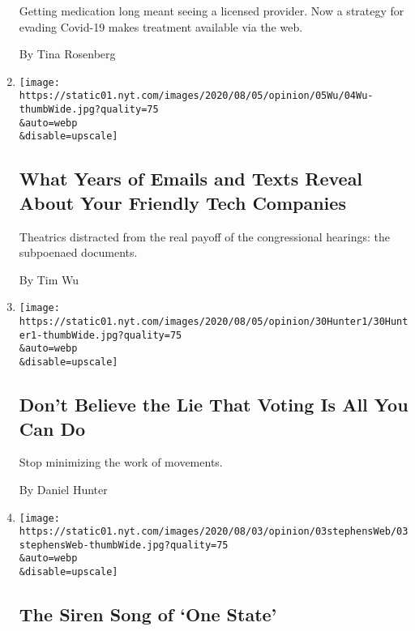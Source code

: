 \begin{enumerate}
  Getting medication long meant seeing a licensed provider. Now a
  strategy for evading Covid-19 makes treatment available via the web.

  By Tina Rosenberg
\item
  \href{/2020/08/04/opinion/amazon-facebook-congressional-hearings.html}{}

  \texttt{[image: https://static01.nyt.com/images/2020/08/05/opinion/05Wu/04Wu-thumbWide.jpg?quality=75\\\&auto=webp\\\&disable=upscale]}

  \hypertarget{what-years-of-emails-and-texts-reveal-about-your-friendly-tech-companies}{%
  \subsection{What Years of Emails and Texts Reveal About Your Friendly
  Tech
  Companies}\label{what-years-of-emails-and-texts-reveal-about-your-friendly-tech-companies}}

  Theatrics distracted from the real payoff of the congressional
  hearings: the subpoenaed documents.

  By Tim Wu
\item
  \href{/2020/08/04/opinion/voting-2020-election-blm-movement.html}{}

  \texttt{[image: https://static01.nyt.com/images/2020/08/05/opinion/30Hunter1/30Hunter1-thumbWide.jpg?quality=75\\\&auto=webp\\\&disable=upscale]}

  \hypertarget{dont-believe-the-lie-that-voting-is-all-you-can-do}{%
  \subsection{Don't Believe the Lie That Voting Is All You Can
  Do}\label{dont-believe-the-lie-that-voting-is-all-you-can-do}}

  Stop minimizing the work of movements.

  By Daniel Hunter
\item
  \href{/2020/08/03/opinion/israel-palestine-one-state-solution.html}{}

  \texttt{[image: https://static01.nyt.com/images/2020/08/03/opinion/03stephensWeb/03stephensWeb-thumbWide.jpg?quality=75\\\&auto=webp\\\&disable=upscale]}

  \hypertarget{the-siren-song-of-one-state}{%
  \subsection{The Siren Song of `One
  State'}\label{the-siren-song-of-one-state}}


\end{enumerate}

